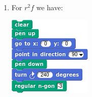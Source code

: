 \documentclass[noauthor,nooutcomes,hints,handout]{ximera}
\begin{document}
\begin{question}
\begin{freeResponse}
\begin{enumerate}
\begin{center}
      \end{center}
    \item For $r^2f$ we have:
      \begin{center}
        \includegraphics[width=.3\textwidth]{r2fTriSCRIPT.png}   \qquad {}
      \end{center}
    \end{enumerate}
    \end{freeResponse}
\end{question}
\mynewpage
\end{document}
